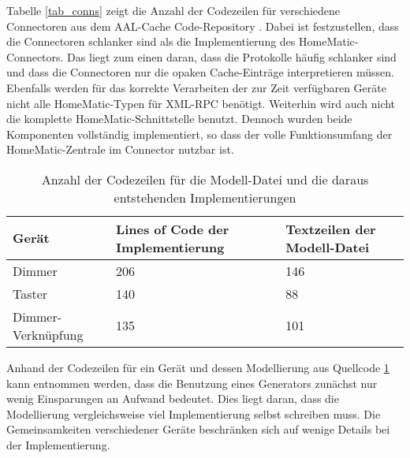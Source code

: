 Tabelle \ref{tab_conns} zeigt die Anzahl der Codezeilen für verschiedene Connectoren aus dem
AAL-Cache Code-Repository \cite{aalcache_code}.
Dabei ist festzustellen, dass die Connectoren schlanker sind als die Implementierung des HomeMatic-Connectors.
Das liegt zum einen daran, dass die Protokolle häufig schlanker sind und dass die Connectoren nur die opaken
Cache-Einträge interpretieren müssen.
Ebenfalls werden für das korrekte Verarbeiten der zur Zeit verfügbaren Geräte nicht alle HomeMatic-Typen
für XML-RPC benötigt.
Weiterhin wird auch nicht die komplette HomeMatic-Schnittstelle benutzt.
Dennoch wurden beide Komponenten vollständig implementiert, so dass der volle Funktionsumfang der HomeMatic-Zentrale
im Connector nutzbar ist.

\begin{table}[h]
\begin{tabular}{|l|p{3cm}|l|}
\hline
Gerät & Lines of Code der Implementierung & Textzeilen der Modell-Datei\\
\hline
Dimmer & 206 & 146\\
Taster & 140 & 88\\
Dimmer-Verknüpfung & 135 & 101\\
\hline
\end{tabular}
\caption{Anzahl der Codezeilen für die Modell-Datei und die daraus entstehenden Implementierungen}
\label{tab_mods}
\end{table}
Anhand der Codezeilen für ein Gerät und dessen Modellierung aus Quellcode \ref{tab_mods} kann entnommen werden,
dass die Benutzung eines Generators zunächst nur wenig Einsparungen an Aufwand bedeutet.
Dies liegt daran, dass die Modellierung vergleichsweise viel Implementierung selbst schreiben muss.
Die Gemeinsamkeiten verschiedener Geräte beschränken sich auf wenige Details bei der Implementierung.

